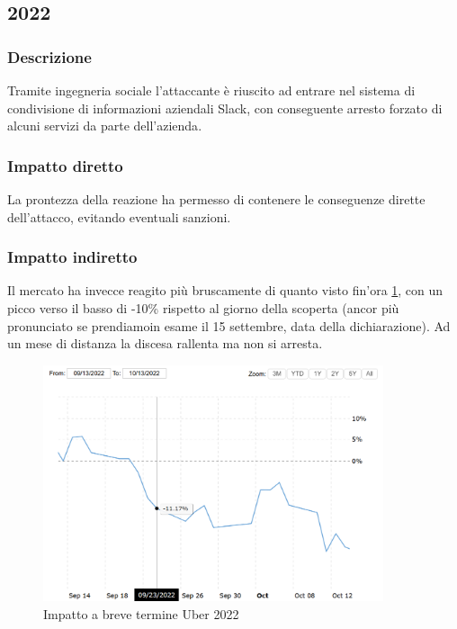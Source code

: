 \documentclass[12pt,a4paper,openright,twoside]{report}
\begin{document}
\subsection{2022}
\subsubsection{Descrizione}
Tramite ingegneria sociale l'attaccante \`e riuscito ad entrare nel sistema di condivisione di informazioni aziendali Slack, con conseguente arresto forzato di alcuni servizi da parte dell'azienda\cite{Uber_2022}.\\
\subsubsection{Impatto diretto}
La prontezza della reazione ha permesso di contenere le conseguenze dirette dell'attacco, evitando eventuali sanzioni.\\ 
\subsubsection{Impatto indiretto}
Il mercato ha invecce reagito pi\`u bruscamente di quanto visto fin'ora \ref{fig:ubr1}, con un picco verso il basso di -10\% rispetto al giorno della scoperta (ancor pi\`u pronunciato se prendiamoin esame il 15 settembre, data della dichiarazione). Ad un mese di distanza la discesa rallenta ma non si arresta.\\

\begin{figure}[H] 
\begin{center} 
\includegraphics[width=10cm]{figures/uber_2022_short.png} 
\caption[Grafico Uber 2022 short]{Impatto a breve termine Uber 2022}\label{fig:ubr1}
\end{center}
\end{figure}
\end{document}
